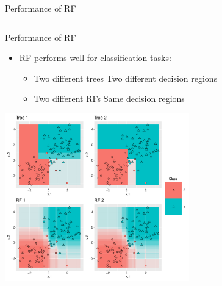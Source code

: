 \documentclass[11pt,compress,t,notes=noshow, xcolor=table]{beamer}
\begin{document}
\begin{vbframe}{Performance of RF}
\begin{columns}
\begin{column}{0.5\textwidth}
\begin{center}
\end{center}
\end{column}
\end{columns}

\end{vbframe}

\begin{vbframe}{Performance of RF}
\begin{itemize}
    \begin{itemize}
        \item \small RF performs well for classification tasks:
        \begin{itemize}
            \item \small Two different trees \textrightarrow Two different decision regions
            \item \small Two different RFs \textrightarrow Same decision regions
        \end{itemize}
    \end{itemize}
\begin{center}
 \includegraphics[width = 0.6\textwidth]{slides/forests/figure/nutshell_classif_combined_1.pdf}
\end{center}
\end{itemize}



\end{vbframe}
\end{document}
